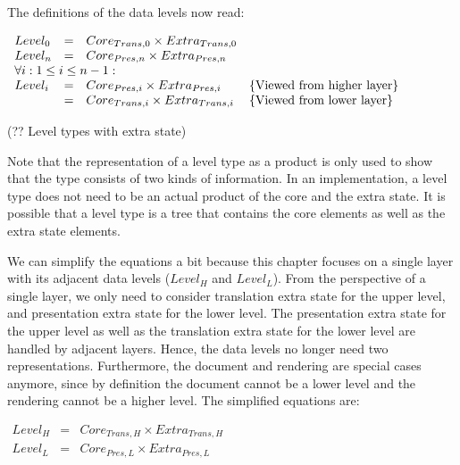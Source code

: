 The definitions of the data levels now read:

\begin{small}\(\begin{array}{lcll}
Level_{0} & = & Core_{Trans,0} \times Extra_{Trans,0}\\
Level_{n} & = & Core_{Pres,n} \times Extra_{Pres,n}\\
\lefteqn{\forall i:1 \le i \le n-1:}  \\
Level_{i}  & = & Core_{Pres,i} \times Extra_{Pres,i}     & \text{\{Viewed from higher layer\}}\\
                & = & Core_{Trans,i} \times Extra_{Trans,i} &  \text{\{Viewed from lower layer\}}\\
\end{array}\)\end{small}
\begin{center}(?? Level types with extra state)\end{center}\vspace{1em}

Note that the representation of a level type as a product is only used to show that the type consists of two kinds of information. In an implementation, a level type does not need to be an actual product of the core and the extra state. It is possible that a level type is a tree that contains the core elements as well as the extra state elements.

We can simplify the equations a bit because this chapter focuses on a single layer with its adjacent data levels ($Level_{H}$ and $Level_{L}$). From the perspective of a single layer, we only need to consider translation extra state for the upper level, and presentation extra state for the lower level. The presentation extra state for the upper level as well as the translation extra state for the lower level are handled by adjacent layers. Hence, the data levels no longer need two representations. Furthermore, the document and rendering are special cases anymore, since by definition the document cannot be a lower level and the rendering cannot be a higher level. The simplified equations are:

\begin{small}\( \begin{array}{lcll}
Level_{H} & = & Core_{Trans, H} \times Extra_{Trans, H}\\
Level_{L} & = & Core_{Pres, L} \times Extra_{Pres, L}\\
\end{array}\)\end{small}

